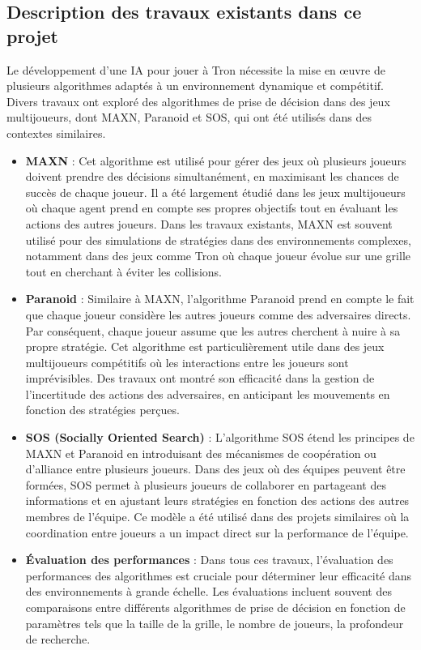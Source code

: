 \documentclass[a4paper,12pt]{article}
\begin{document}
\subsection{Description des travaux existants dans ce projet}

Le développement d'une IA pour jouer à Tron nécessite la mise en œuvre de plusieurs algorithmes adaptés à un environnement dynamique et compétitif. Divers travaux ont exploré des algorithmes de prise de décision dans des jeux multijoueurs, dont MAXN, Paranoid et SOS, qui ont été utilisés dans des contextes similaires.

\begin{itemize} 
    \item \textbf{MAXN} : Cet algorithme est utilisé pour gérer des jeux où plusieurs joueurs doivent prendre des décisions simultanément, en maximisant les chances de succès de chaque joueur. Il a été largement étudié dans les jeux multijoueurs où chaque agent prend en compte ses propres objectifs tout en évaluant les actions des autres joueurs. Dans les travaux existants, MAXN est souvent utilisé pour des simulations de stratégies dans des environnements complexes, notamment dans des jeux comme Tron où chaque joueur évolue sur une grille tout en cherchant à éviter les collisions.
    
    \item \textbf{Paranoid} : Similaire à MAXN, l'algorithme Paranoid prend en compte le fait que chaque joueur considère les autres joueurs comme des adversaires directs. Par conséquent, chaque joueur assume que les autres cherchent à nuire à sa propre stratégie. Cet algorithme est particulièrement utile dans des jeux multijoueurs compétitifs où les interactions entre les joueurs sont imprévisibles. Des travaux ont montré son efficacité dans la gestion de l'incertitude des actions des adversaires, en anticipant les mouvements en fonction des stratégies perçues.
    
   \item \textbf{SOS (Socially Oriented Search)} : L'algorithme SOS étend les principes de MAXN et Paranoid en introduisant des mécanismes de coopération ou d'alliance entre plusieurs joueurs. Dans des jeux où des équipes peuvent être formées, SOS permet à plusieurs joueurs de collaborer en partageant des informations et en ajustant leurs stratégies en fonction des actions des autres membres de l'équipe. Ce modèle a été utilisé dans des projets similaires où la coordination entre joueurs a un impact direct sur la performance de l’équipe.
    
    \item \textbf{Évaluation des performances} : Dans tous ces travaux, l'évaluation des performances des algorithmes est cruciale pour déterminer leur efficacité dans des environnements à grande échelle. Les évaluations incluent souvent des comparaisons entre différents algorithmes de prise de décision en fonction de paramètres tels que la taille de la grille, le nombre de joueurs, la profondeur de recherche. 
    
\end{itemize}
\end{document}
